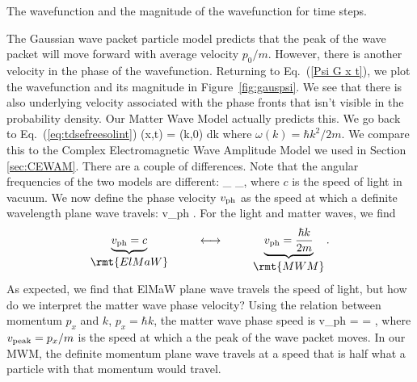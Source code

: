 \begin{marginfigure}[2cm]
\caption{The wavefunction and the magnitude of the wavefunction for time steps.}
\label{fig:gauspsi}
\end{marginfigure}

The Gaussian wave packet particle model predicts that the peak of the wave packet will move forward with average velocity $p_0/m$. However, there is another velocity in the phase of the wavefunction. Returning to Eq.~(\ref{Psi  G x t}), we plot the wavefunction and its magnitude in Figure~\ref{fig:gauspsi}. We see that there is also underlying velocity associated with the phase fronts that isn't visible in the probability density. Our Matter Wave Model actually predicts this. We go back to Eq.~(\ref{eq:tdsefreesolint})
\beq
\psi(x,t) = \sqrt{\frac{\hbar}{2\pi}}  \intii\phi(\hbar k,0) dk
\eeq
where $\omega(k) = \hbar k^2/2m$. We compare this to the Complex Electromagnetic Wave Amplitude Model we used in Section \ref{sec:CEWAM}. There are a couple of differences. Note that the angular frequencies of the two models are different:
\beq
{}_{\displaystyle {}} \quad \longleftrightarrow \quad {}_{\displaystyle {}},
\eeq
where $c$ is the speed of light in vacuum. 
We now define the phase velocity $v_{\rm ph}$ as the speed at which a definite wavelength plane wave travels:
%
\beq
v_{\rm ph} \equiv {}.
\eeq
%
For the light and matter waves, we find 
%
\begin{equation}
\underbrace{v_{\rm ph} = c}_{\displaystyle \rmt{ElMaW}} \phantom{space} \longleftrightarrow  \phantom{space} \underbrace{v_{\rm ph}  = \frac{\hbar k}{2m}}_{\displaystyle \rmt{MWM}}.
\end{equation}
%
As expected, we find that ElMaW plane wave travels the speed of light, but how do we interpret the matter wave phase velocity?  Using the relation between momentum $p_x$ and $k$, $p_x = \hbar k$, the matter wave phase speed is
%
\beq
v_{\rm ph} =  = ,
\eeq
%
where $v_{\rm peak} = p_x/m$ is the speed at which a the peak of the wave packet moves.  In our MWM, the definite momentum plane wave travels at a speed that is half what a particle with that momentum would travel.

